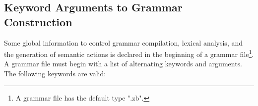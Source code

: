 \subsection{Keyword Arguments to Grammar Construction}
\label{grammar-options}

Some global information to control grammar compilation, lexical
analysis, and the generation of semantic actions is declared in the
beginning of a grammar file\footnote{A grammar file has the default
type ".zb".}. A grammar file must begin with a list of alternating
keywords and arguments.  The following keywords are valid:

  
 
  
  

